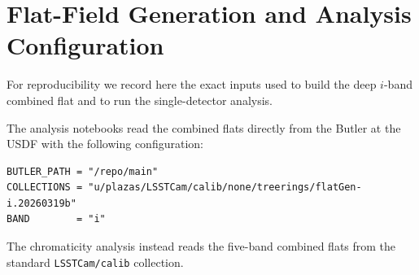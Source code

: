 \section{Flat-Field Generation and Analysis Configuration} \label{app:config}

For reproducibility we record here the exact inputs used to build the deep $i$-band combined
flat and to run the single-detector analysis.

The analysis notebooks read the combined flats directly from the Butler at the USDF with the
following configuration:
%
{\footnotesize
\begin{verbatim}
BUTLER_PATH = "/repo/main"
COLLECTIONS = "u/plazas/LSSTCam/calib/none/treerings/flatGen-i.20260319b"
BAND        = "i"
\end{verbatim}
}
%
The chromaticity analysis instead reads the five-band combined flats from the standard
\texttt{LSSTCam/calib} collection.

